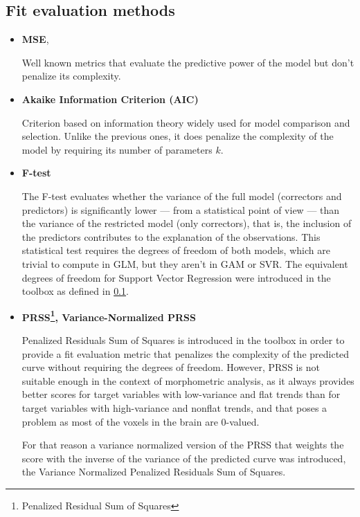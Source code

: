 \documentclass{article}
\begin{document}
\subsection{Fit evaluation methods}
\begin{itemize}
	
\item \textbf{MSE}, 

Well known metrics that evaluate the predictive power of the model but don't penalize its complexity.

\item \textbf{Akaike Information Criterion (AIC)}

Criterion based on information theory widely used for model comparison and selection. Unlike the previous ones, it does penalize the complexity of the model by requiring its number of parameters $k$.

\item \textbf{F-test} 

The F-test evaluates whether the variance of the full model (correctors and predictors) is significantly lower — from a statistical point of view — than the variance of the restricted model (only correctors), that is, the inclusion of the predictors contributes to the explanation of the observations. 
This statistical test requires the degrees of freedom of both models, which are trivial to compute in GLM, but they aren't in GAM or SVR. The equivalent degrees of freedom for Support Vector Regression were introduced in the toolbox as defined in \ref{}.

\item \textbf{PRSS\footnote{Penalized Residual Sum of Squares}, Variance-Normalized PRSS} 

Penalized Residuals Sum of Squares is introduced in the toolbox in order to provide a fit evaluation metric that penalizes the complexity of the predicted curve without requiring the degrees of freedom. However, PRSS is not suitable enough in the context of morphometric analysis, as it always provides better scores for target variables with low-variance and flat trends than for target variables with high-variance and nonflat trends, and that poses a problem as most of the voxels in the brain are 0-valued. 

For that reason a variance normalized version of the PRSS that weights the score with the inverse of the variance of the predicted curve was introduced, the Variance Normalized Penalized Residuals Sum of Squares.

\end{itemize}
\end{document}
